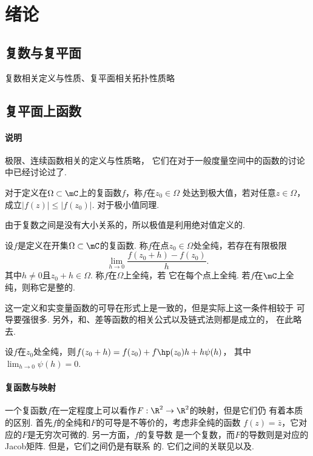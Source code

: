 \section{绪论}

\subsection{复数与复平面}

  复数相关定义与性质、复平面相关拓扑性质略

\subsection{复平面上函数}

  \paragraph{说明}
    极限、连续函数相关的定义与性质略，
    它们在对于一般度量空间中的函数的讨论中已经讨论过了.

  \begin{defi}[极值]
    对于定义在$\Omega\subset\mC$上的复函数$f$，称$f$在$z_0\in\Omega$
    处达到极大值，若对任意$z\in\Omega$，成立$|f(z)| \le |f(z_0)|$.
    对于极小值同理.
  \end{defi}
  \remark
    由于复数之间是没有大小关系的，所以极值是利用绝对值定义的.

  \begin{defi}
    设$f$是定义在开集$\Omega\subset\mC$的复函数. 称$f$在点$z_0
    \in\Omega$处全纯，若存在有限极限
    \[
      \lim_{h\to 0}\frac{f(z_0+h) - f(z_0)}{h}.
    \]
    其中$h\ne 0$且$z_0+h\in\Omega$. 称$f$在$\Omega$上全纯，若
    它在每个点上全纯. 若$f$在$\mC$上全纯，则称它是整的.
  \end{defi}
  \remark
    这一定义和实变量函数的可导在形式上是一致的，但是实际上这一条件相较于
    可导要强很多. 另外，和、差等函数的相关公式以及链式法则都是成立的，
    在此略去.

  \begin{pos}[有限增量公式]
    设$f$在$z_0$处全纯，则$f(z_0+h)=f(z_0)+f\hp(z_0)h + h\psi(h)$，
    其中$\lim_{h\to 0}\psi(h)=0$.
  \end{pos}

  \paragraph{复函数与映射}
    一个复函数$f$在一定程度上可以看作$F:\R^2\to\R^2$的映射，但是它们仍
    有着本质的区别. 首先$f$的全纯和$F$的可导是不等价的，考虑非全纯的函数
    $f(z)=\bar{z}$，它对应的$F$是无穷次可微的. 另一方面，$f$的复导数
    是一个复数，而$F$的导数则是对应的Jacob矩阵. 但是，它们之间仍是有联系
    的. 它们之间的关联见以及.

